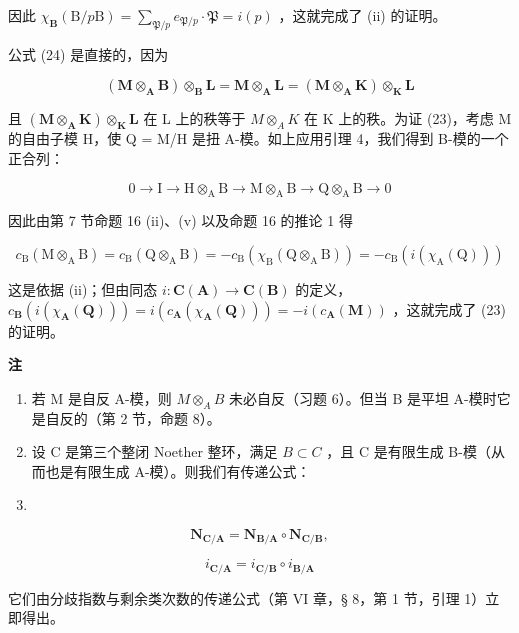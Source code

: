 因此 \(\chi_{\mathbf{B}}(\mathrm{B} / p\mathrm{B}) = \sum_{\mathfrak{P} / p}e_{\mathfrak{P} / p}\cdot \mathfrak{P} = i(p)\) ，这就完成了 (ii) 的证明。

公式 (24) 是直接的，因为

\[
(\mathbf {M} \otimes_ {\mathbf {A}} \mathbf {B}) \otimes_ {\mathbf {B}} \mathbf {L} = \mathbf {M} \otimes_ {\mathbf {A}} \mathbf {L} = (\mathbf {M} \otimes_ {\mathbf {A}} \mathbf {K}) \otimes_ {\mathbf {K}} \mathbf {L}
\]

且 \((\mathbf{M} \otimes_{\mathbf{A}} \mathbf{K}) \otimes_{\mathbf{K}} \mathbf{L}\) 在 L 上的秩等于 \(M \otimes_{A} K\) 在 K 上的秩。为证 (23)，考虑 M 的自由子模 H，使 Q = M/H 是扭 A-模。如上应用引理 4，我们得到 B-模的一个正合列：

\[
0 \rightarrow \mathrm{I} \rightarrow \mathrm{H} \otimes_ {\mathrm{A}} \mathrm{B} \rightarrow \mathrm{M} \otimes_ {\mathrm{A}} \mathrm{B} \rightarrow \mathrm{Q} \otimes_ {\mathrm{A}} \mathrm{B} \rightarrow 0
\]

因此由第 7 节命题 16 (ii)、(v) 以及命题 16 的推论 1 得

\[
c _ {\mathrm{B}} (\mathrm{M} \otimes_ {\mathrm{A}} \mathrm{B}) = c _ {\mathrm{B}} (\mathrm{Q} \otimes_ {\mathrm{A}} \mathrm{B}) = - c _ {\mathrm{B}} \left(\chi_ {\mathrm{B}} (\mathrm{Q} \otimes_ {\mathrm{A}} \mathrm{B})\right) = - c _ {\mathrm{B}} (i \left(\chi_ {\mathrm{A}} (\mathrm{Q})\right))
\]

这是依据 (ii)；但由同态 \(i: \mathbf{C}(\mathbf{A}) \to \mathbf{C}(\mathbf{B})\) 的定义，\(c_{\mathbf{B}}(i(\chi_{\mathbf{A}}(\mathbf{Q}))) = i(c_{\mathbf{A}}(\chi_{\mathbf{A}}(\mathbf{Q}))) = -i(c_{\mathbf{A}}(\mathbf{M}))\) ，这就完成了 (23) 的证明。

\textbf{注}\par

\begin{enumerate}
\def\labelenumi{(\arabic{enumi})}
\item
  若 M 是自反 A-模，则 \(M \otimes_{A} B\) 未必自反（习题 6）。但当 B 是平坦 A-模时它是自反的（第 2 节，命题 8）。
\item
  设 C 是第三个整闭 Noether 整环，满足 \(B \subset C\) ，且 C 是有限生成 B-模（从而也是有限生成 A-模）。则我们有传递公式：
\item
\end{enumerate}

\[
\mathbf {N} _ {\mathbf {C} / \mathbf {A}} = \mathbf {N} _ {\mathbf {B} / \mathbf {A}} \circ \mathbf {N} _ {\mathbf {C} / \mathbf {B}},\tag{26}
\]

\[
i _ {\mathbf {C} / \mathbf {A}} = i _ {\mathbf {C} / \mathbf {B}} \circ i _ {\mathbf {B} / \mathbf {A}}
\]

它们由分歧指数与剩余类次数的传递公式（第 VI 章，§ 8，第 1 节，引理 1）立即得出。

